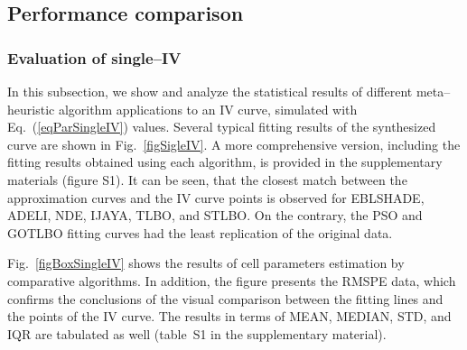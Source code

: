 \documentclass[a4paper,fleqn]{cas-sc}
\begin{document}

\subsection{Performance comparison}

\subsubsection{Evaluation of single--IV}

In this subsection, we show and analyze the statistical results of different meta--heuristic algorithm
applications to an IV curve, simulated with Eq.~(\ref{eqParSingleIV}) values.
Several typical fitting results of the synthesized curve are shown in Fig.~\ref{figSigleIV}.
A more comprehensive version, including the fitting results obtained using each algorithm,
is provided in the supplementary materials (figure S1).
It can be seen, that the closest match between the approximation curves and the IV curve points is
observed for EBLSHADE, ADELI, NDE, IJAYA, TLBO, and STLBO.
On the contrary, the PSO and GOTLBO fitting curves had the least replication of the original data.

Fig.~\ref{figBoxSingleIV} shows the results of cell parameters estimation by comparative algorithms.
In addition, the figure presents the RMSPE data,
which confirms the conclusions of the visual comparison between the fitting lines and the points of the IV curve.
The results in terms of MEAN, MEDIAN, STD, and IQR are tabulated as well (table~S1 in the supplementary material).
\end{document}
